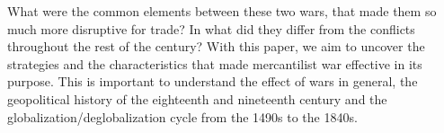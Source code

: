 \documentclass[12pt,a4paper,notitlepage,english]{article}
\newcommand{\source}[1]{\caption*{\footnotesize Source: {#1}} }
\begin{document}
What were the common elements between these two wars, that made them so much more disruptive for trade? In what did they differ from the conflicts throughout the rest of the century? With this paper, we aim to uncover the strategies and the characteristics that made mercantilist war effective in its purpose. This is important to understand the effect of wars in general, the geopolitical history of the eighteenth and nineteenth century and the globalization/deglobalization cycle from the 1490s to the 1840s.
\end{document}
